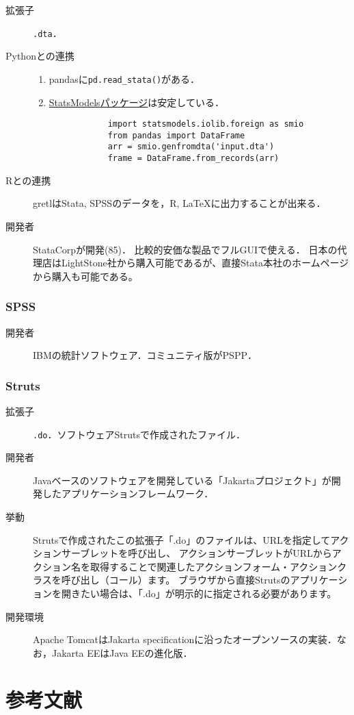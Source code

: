 \documentclass[uplatex,dvipdfmx]{jsreport}
\begin{document}
\begin{description}
    \item[拡張子] \texttt{.dta}．
    \item[Pythonとの連携] \begin{enumerate}
        \item pandasに\texttt{pd.read\_stata()}がある．
        \item \href{https://www.statsmodels.org/stable/index.html}{StatsModelsパッケージ}は安定している．
        \begin{lstlisting}
            import statsmodels.iolib.foreign as smio
            from pandas import DataFrame
            arr = smio.genfromdta('input.dta')
            frame = DataFrame.from_records(arr)
        \end{lstlisting}
    \end{enumerate}
    \item[Rとの連携] gretlはStata, SPSSのデータを，R, LaTeXに出力することが出来る．
    \item[開発者] StataCorpが開発(85)．
    比較的安価な製品でフルGUIで使える．
    日本の代理店はLightStone社から購入可能であるが、直接Stata本社のホームページから購入も可能である。 
\end{description}

\subsection{SPSS}

\begin{description}
    \item[開発者] IBMの統計ソフトウェア．コミュニティ版がPSPP．
\end{description}

\subsection{Struts}

\begin{description}
    \item[拡張子] \texttt{.do}．ソフトウェアStrutsで作成されたファイル．
    \item[開発者] Javaベースのソフトウェアを開発している「Jakartaプロジェクト」が開発したアプリケーションフレームワーク．
    \item[挙動] Strutsで作成されたこの拡張子「.do」のファイルは、URLを指定してアクションサーブレットを呼び出し、
    アクションサーブレットがURLからアクション名を取得することで関連したアクションフォーム・アクションクラスを呼び出し（コール）ます。
    ブラウザから直接Strutsのアプリケーションを開きたい場合は、「.do」が明示的に指定される必要があります。
    \item[開発環境] Apache TomcatはJakarta specificationに沿ったオープンソースの実装．なお，Jakarta EEはJava EEの進化版．
\end{description}


\chapter{参考文献}


\end{document}
